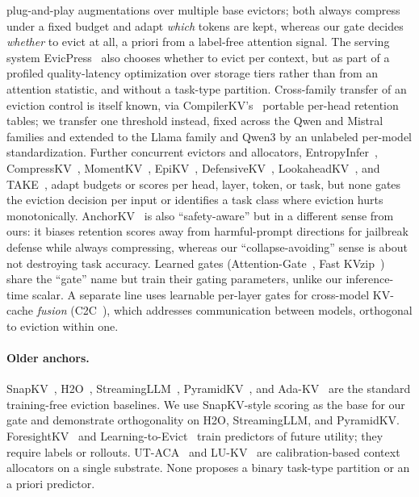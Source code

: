 \documentclass{article}
\begin{document}
plug-and-play augmentations over multiple base evictors; both always compress
under a fixed budget and adapt \emph{which} tokens are kept, whereas our gate
decides \emph{whether} to evict at all, a priori from a label-free attention
signal. The serving system EvicPress~\citep{arxiv251214946} also chooses whether
to evict per context, but as part of a profiled quality-latency optimization
over storage tiers rather than from an attention statistic, and without a
task-type partition. Cross-family transfer of an eviction
control is itself known, via CompilerKV's~\citep{arxiv260208686} portable
per-head retention tables; we transfer one threshold instead, fixed across the
Qwen and Mistral families and extended to the Llama family and Qwen3 by an
unlabeled per-model standardization. Further concurrent evictors and allocators,
EntropyInfer~\citep{arxiv260609508},
CompressKV~\citep{arxiv260624467}, MomentKV~\citep{arxiv260601563},
EpiKV~\citep{arxiv260626472}, DefensiveKV~\citep{arxiv251013334},
LookaheadKV~\citep{arxiv260310899}, and
TAKE~\citep{take-openreview}, adapt
budgets or scores per head, layer, token, or task, but none gates the eviction
decision per input or identifies a task class where eviction hurts
monotonically. AnchorKV~\citep{arxiv260617872} is also ``safety-aware'' but in a
different sense from ours: it biases retention scores away from harmful-prompt
directions for jailbreak defense while always compressing, whereas our
``collapse-avoiding'' sense is about not destroying task accuracy. Learned gates
(Attention-Gate~\citep{arxiv241012876}, Fast
KVzip~\citep{arxiv260117668}) share the ``gate'' name but train their gating
parameters, unlike our inference-time scalar. A separate line uses learnable
per-layer gates for cross-model KV-cache \emph{fusion}
(C2C~\citep{arxiv251003215}), which addresses communication between models,
orthogonal to eviction within one.

\paragraph{Older anchors.}
SnapKV~\citep{arxiv240414469}, H2O~\citep{arxiv230614048},
StreamingLLM~\citep{arxiv230917453}, PyramidKV~\citep{arxiv240602069}, and
Ada-KV~\citep{arxiv240711550} are the standard
training-free eviction baselines. We use SnapKV-style scoring as the base for
our gate and demonstrate orthogonality on H2O, StreamingLLM, and PyramidKV.
ForesightKV~\citep{arxiv260203203} and Learning-to-Evict~\citep{arxiv260210238}
train predictors of future utility; they require labels or rollouts. UT-ACA~%
\citep{arxiv260318446} and LU-KV~\citep{arxiv260208585} are calibration-based
context allocators on a single substrate. None proposes a binary task-type
partition or an a priori predictor.
\end{document}
